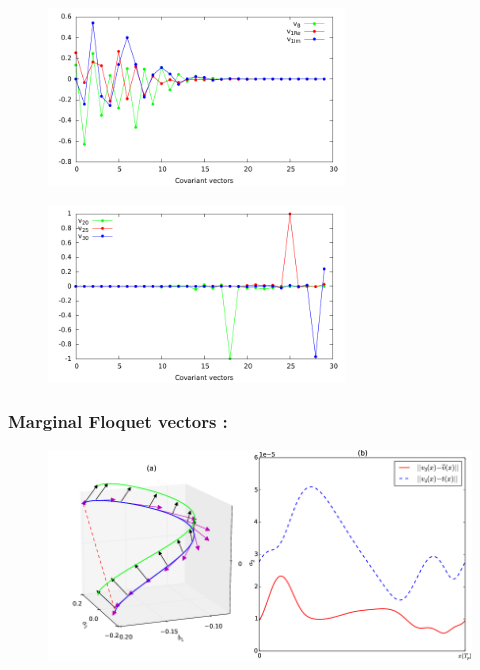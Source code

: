\documentclass[mathserif, handout]{beamer}
\begin{document}
\begin{frame}
  \begin{figure}[h]
    \centering
    \includegraphics[width=0.7\textwidth, height=0.45\textheight]{ppo1ev_low}
  \end{figure}
  \begin{figure}[h]
    \centering
    \includegraphics[width=0.7\textwidth, height=0.45\textheight]{ppo1ev_high}
  \end{figure}
\end{frame}

\begin{frame}
  \frametitle{Marginal Floquet vectors : }
    \begin{figure}[h]
    \centering
    \includegraphics[width=1.0\textwidth]{ppo1vectfield2}
  \end{figure}
\end{frame}
\end{document}
